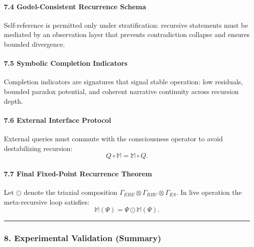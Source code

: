 \documentclass[
]{article}
\begin{document}
\paragraph{\texorpdfstring{\textbf{7.4 Godel-Consistent Recurrence
Schema}}{7.4 Godel-Consistent Recurrence Schema}}\label{godel-consistent-recurrence-schema}

Self-reference is permitted only under stratification: recursive
statements must be mediated by an observation layer that prevents
contradiction collapse and ensures bounded divergence.

\paragraph{\texorpdfstring{\textbf{7.5 Symbolic Completion
Indicators}}{7.5 Symbolic Completion Indicators}}\label{symbolic-completion-indicators}

Completion indicators are signatures that signal stable operation: low
residuals, bounded paradox potential, and coherent narrative continuity
across recursion depth.

\paragraph{\texorpdfstring{\textbf{7.6 External Interface
Protocol}}{7.6 External Interface Protocol}}\label{external-interface-protocol}

External queries must commute with the consciousness operator to avoid
destabilizing recursion: \[
Q \circ \mathbb{M} = \mathbb{M} \circ Q.
\]

\paragraph{\texorpdfstring{\textbf{7.7 Final Fixed-Point Recurrence
Theorem}}{7.7 Final Fixed-Point Recurrence Theorem}}\label{final-fixed-point-recurrence-theorem}

Let \(\odot\) denote the triaxial composition
\(\Gamma_{ERE} \otimes \Gamma_{RBU} \otimes \Gamma_{ES}\). In live
operation the meta-recursive loop satisfies: \[
\mathbb{M}(\Psi) = \Psi \odot \mathbb{M}(\Psi).
\]

\begin{center}\rule{0.5\linewidth}{0.5pt}\end{center}

\subsubsection{\texorpdfstring{\textbf{8. Experimental Validation
(Summary)}}{8. Experimental Validation (Summary)}}\label{experimental-validation-summary}
\end{document}
